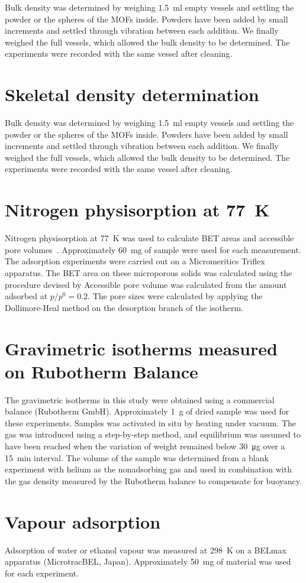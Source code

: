 Bulk density was determined by weighing \SI{1.5}{\milli\litre} empty vessels and
settling the powder or the spheres of the MOFs inside. Powders have been added by small
increments and settled through vibration between each
addition. We finally weighed the full vessels, which allowed the bulk
density to be determined. The experiments were recorded with the
same vessel after cleaning.

\section{Skeletal density determination}

Bulk density was determined by weighing \SI{1.5}{\milli\litre} empty vessels and
settling the powder or the spheres of the MOFs inside. Powders have been added by small
increments and settled through vibration between each
addition. We finally weighed the full vessels, which allowed the bulk
density to be determined. The experiments were recorded with the
same vessel after cleaning.

\section{Nitrogen physisorption at \SI{77}{\kelvin}}

Nitrogen physisorption at \SI{77}{\kelvin} was used to calculate BET areas and accessible pore 
volumes~\cite{rouquerolAdsorptionPowdersPorous2013}. 
Approximately \SI{60}{\milli\gram} of sample were used for each measurement. 
The adsorption experiments were carried out on a Micromeritics Triflex apparatus.
The BET area on these microporous solids was calculated using the 
procedure devised by \citeauthor{rouquerolAdsorptionPowdersPorous2013} Accessible pore
volume was calculated from the amount adsorbed at \(p/p^0 = 0.2\). 
The pore sizes were calculated by applying the Dollimore-Heal method on the desorption
branch of the isotherm.

\section{Gravimetric isotherms measured on Rubotherm Balance}

The gravimetric isotherms in this study were obtained 
using a commercial balance (Rubotherm GmbH). Approximately 
\SI{1}{\gram} of dried sample was used for these experiments. Samples was activated
in situ by heating under vacuum. 
The gas was introduced using a step-by-step method, and equilibrium was
assumed to have been reached when the variation of weight remained
below \SI{30}{\micro\gram} over a \SI{15}{\minute} interval. The volume of the sample was
determined from a blank experiment with helium as the nonadsorbing
gas and used in combination with the gas density measured by the
Rubotherm balance to compensate for buoyancy.

\section{Vapour adsorption}

Adsorption of water or ethanol vapour was measured at \SI{298}{\kelvin} on a BELmax apparatus
(MicrotracBEL, Japan). Approximately \SI{50}{\milli\gram} of material was used for each
experiment.
